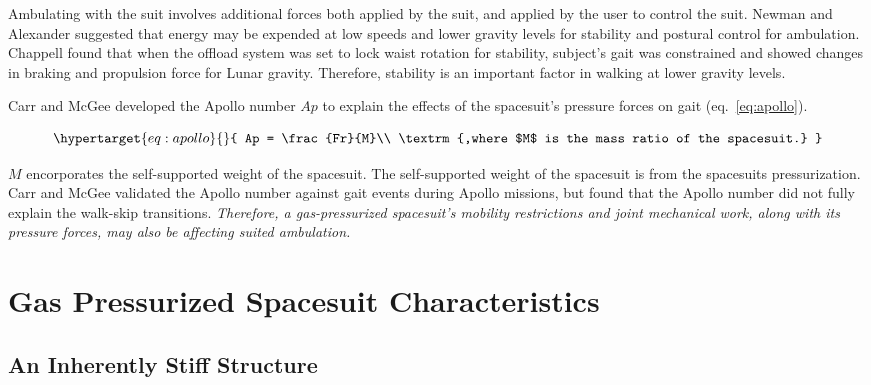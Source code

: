 \documentclass[defaultstyle,11pt]{thesis}
\begin{document}
Ambulating with the suit involves additional forces both applied by the suit, and applied by the user to control the suit.
Newman and Alexander \citep{Newman1993} suggested that energy may be expended at low speeds and lower gravity levels for stability and postural control for ambulation.
Chappell \citep{Chappell2006} found that when the offload system was set to lock waist rotation for stability, subject's gait was constrained and showed changes in braking and propulsion force for Lunar gravity.
Therefore, stability is an important factor in walking at lower gravity levels.

Carr and McGee \citep{Carr2009} developed the Apollo number \(Ap\) to explain the effects of the spacesuit's pressure forces on gait (eq.~\ref{eq:apollo}).

\begin{equation}\protect\hypertarget{eq:apollo}{}{
Ap = \frac{Fr}{M}\\
\textrm{,where $M$ is the mass ratio of the spacesuit.}
}\label{eq:apollo}\end{equation}

\(M\) encorporates the self-supported weight of the spacesuit.
The self-supported weight of the spacesuit is from the spacesuits pressurization.
Carr and McGee validated the Apollo number against gait events during Apollo missions, but found that the Apollo number did not fully explain the walk-skip transitions.
\emph{Therefore, a gas-pressurized spacesuit's mobility restrictions and joint mechanical work, along with its pressure forces, may also be affecting suited ambulation.}

\hypertarget{gas-pressurized-spacesuit-characteristics}{%
\section{Gas Pressurized Spacesuit Characteristics}\label{gas-pressurized-spacesuit-characteristics}}

\hypertarget{an-inherently-stiff-structure}{%
\subsection{An Inherently Stiff Structure}\label{an-inherently-stiff-structure}}
\end{document}
